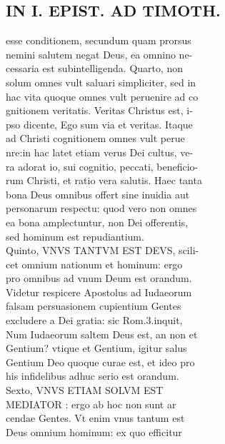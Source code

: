 \documentclass{article}
\begin{document}
\begin{pages}
\section*{IN I. EPIST. AD TIMOTH. \\
                }
esse conditionem, secundum quam prorsus \\
                nemini salutem negat Deus, ea omnino ne- \\
                cessaria est subintelligenda. Quarto, non \\
                solum omnes vult saluari simpliciter, sed in \\
                hac vita quoque omnes vult peruenire ad co \\
                gnitionem veritatis. Veritas Christus est, i- \\
                pso dicente, Ego sum via et veritas. Itaque \\
                ad Christi cognitionem omnes vult perue \\
                nre:in hac latet etiam verus Dei cultus, ve- \\
                ra adorat io, sui cognitio, peccati, beneficio- \\
                rum Christi, et ratio vera salutis. Haec tanta \\
                bona Deus omnibus offert sine inuidia aut \\
                personarum respectu: quod vero non omnes \\
                ea bona amplectuntur, non Dei offerentis, \\
                sed hominum est repudiantium. \\
                Quinto, VNVS TANTVM EST DEVS, scili- \\
                cet omnium nationum et hominum: ergo \\
                pro omnibus ad vnum Deum est orandum. \\
                Videtur respicere Apostolus ad Iudaeorum \\
                falsam persuasionem cupientium Gentes \\
                excludere a Dei gratia: sic Rom.3.inquit, \\
                Num Iudaeorum saltem Deus est, an non et \\
                Gentium? vtique et Gentium, igitur salus \\
                Gentium Deo quoque curae est, et ideo pro \\
                his infidelibus adhuc serio est orandum. \\
                Sexto, VNVS ETIAM SOLVM EST \\
                MEDIATOR : ergo ab hoc non sunt ar \\
                cendae Gentes. Vt enim vnus tantum est \\
                Deus omnium hominum: ex quo efficitur \\
                

\end{pages}
\end{document}
